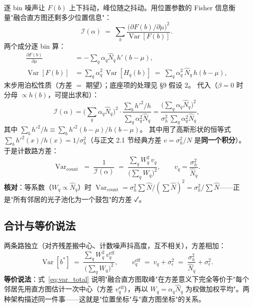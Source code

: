 \documentclass[11pt]{ctexart}
\newcommand{\Var}{\operatorname{Var}}
\begin{document}
逐 bin 噪声让 $F(b)$ 上下抖动，峰位随之抖动。用位置参数的 Fisher 信息衡量"融合直方图还剩多少位置信息"：
\begin{equation}
  \mathcal I(\alpha)\;=\;\sum_b\frac{\big(\partial F(b)/\partial\mu\big)^2}{\Var[F(b)]}.
\end{equation}
两个成分逐 bin 算：
\begin{align}
  \frac{\partial F(b)}{\partial\mu} &= -\sum_q \alpha_q\hat N_q\,h'(b-\mu),\\
  \Var[F(b)] &= \sum_q \alpha_q^2\,\Var[H_q(b)]\;=\;\sum_q \alpha_q^2\,\hat N_q\,h(b-\mu),
\end{align}
末步用泊松性质（方差 $=$ 期望）；底座项的处理见 \S9 假设 2。
代入（$\beta=0$ 时分母 $\propto h(b)$，可提出求和）：
\begin{equation}
  \mathcal I(\alpha)
  =\Big(\sum_q \alpha_q\hat N_q\Big)^2
   \cdot\frac{\sum_b h'^2/h}{\sum_q \alpha_q^2\hat N_q}
  =\frac{\big(\sum_q \alpha_q\hat N_q\big)^2}{\sigma_h^2\,\sum_q \alpha_q^2\hat N_q},
\end{equation}
其中 $\sum_b h'^2/h\equiv\sum_b h'^2(b-\mu)/h(b-\mu)$。
其中用了高斯形状的恒等式 $\sum_b h'^2(x)/h(x)=1/\sigma_h^2$（与正文 2.1 节经典方差 $v=\sigma_h^2/N$ 是\textbf{同一个积分}）。于是计数路方差：
\begin{equation}
  \Var_{\text{count}}\;=\;\frac{1}{\mathcal I(\alpha)}
  \;=\;\frac{\sum_q W_q^2\,v_q}{\big(\sum_q W_q\big)^2},
  \qquad v_q=\frac{\sigma_h^2}{\hat N_q}.
  \label{eq:var_count}
\end{equation}
\textbf{核对}：等系数（$W_q\propto\hat N_q$）时 $\Var_{\text{count}}=\sigma_h^2\sum\hat N/(\sum\hat N)^2=\sigma_h^2/\sum\hat N$——正是"所有邻居的光子池化为一个鼓包"的方差 ✓。

\subsection{合计与等价说法}

两条路独立（对齐残差搬中心、计数噪声抖高度，互不相关），方差相加：
\begin{equation}
  \Var[b^*]\;=\;\frac{\sum_q W_q^2\,v^{\mathrm{eff}}_q}{\big(\sum_q W_q\big)^2},
  \qquad
  v^{\mathrm{eff}}_q\;=\;v_q+\sigma_\epsilon^2\;=\;\frac{\sigma_h^2}{\hat N_q}+\sigma_\epsilon^2.
  \label{eq:var_total}
\end{equation}
\textbf{等价说法}：式~\eqref{eq:var_total} 说明"融合直方图取峰"在方差意义下完全等价于"每个邻居先用直方图估计一次中心（方差 $v^{\mathrm{eff}}_q$），再以 $W_q=\alpha_q\hat N_q$ 为权做加权平均"。两种架构描述同一件事——这就是"位置坐标"与"直方图坐标"的关系。
\end{document}
